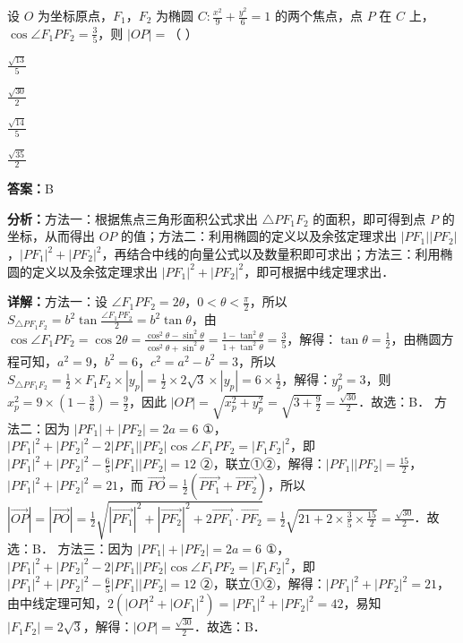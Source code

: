 \begin{question}[points=5]
设 $O$ 为坐标原点，$F_1$，$F_2$ 为椭圆 $C: \frac{x^2}{9} + \frac{y^2}{6} = 1$ 的两个焦点，点 $P$ 在 $C$ 上，$\cos\angle F_1PF_2 = \frac{3}{5}$，则 $|OP| = $（         ）
\begin{choices}
  \item $\frac{\sqrt{13}}{5}$
  \item $\frac{\sqrt{30}}{2}$
  \item $\frac{\sqrt{14}}{5}$
  \item $\frac{\sqrt{35}}{2}$
\end{choices}
\begin{solution}
\textbf{答案：}B

\textbf{分析：}方法一：根据焦点三角形面积公式求出 $\triangle PF_1F_2$ 的面积，即可得到点 $P$ 的坐标，从而得出 $OP$ 的值；方法二：利用椭圆的定义以及余弦定理求出 $|PF_1||PF_2|$，$|PF_1|^2+|PF_2|^2$，再结合中线的向量公式以及数量积即可求出；方法三：利用椭圆的定义以及余弦定理求出 $|PF_1|^2+|PF_2|^2$，即可根据中线定理求出．

\textbf{详解：}方法一：设 $\angle F_1PF_2 = 2\theta$，$0<\theta<\frac{\pi}{2}$，所以 $S_{\triangle PF_1F_2} = b^2\tan\frac{\angle F_1PF_2}{2} = b^2\tan\theta$，由 $\cos\angle F_1PF_2 = \cos2\theta = \frac{\cos^2\theta-\sin^2\theta}{\cos^2\theta+\sin^2\theta} = \frac{1-\tan^2\theta}{1+\tan^2\theta} = \frac{3}{5}$，解得：$\tan\theta = \frac{1}{2}$，由椭圆方程可知，$a^2=9$，$b^2=6$，$c^2=a^2-b^2=3$，所以 $S_{\triangle PF_1F_2} = \frac{1}{2}\times F_1F_2\times|y_p| = \frac{1}{2}\times2\sqrt{3}\times|y_p| = 6\times\frac{1}{2}$，解得：$y_p^2=3$，则 $x_p^2 = 9\times\left(1-\frac{3}{6}\right) = \frac{9}{2}$，因此 $|OP| = \sqrt{x_p^2+y_p^2} = \sqrt{3+\frac{9}{2}} = \frac{\sqrt{30}}{2}$．故选：B．
方法二：因为 $|PF_1|+|PF_2|=2a=6$ ①，$|PF_1|^2+|PF_2|^2-2|PF_1||PF_2|\cos\angle F_1PF_2 = |F_1F_2|^2$，即 $|PF_1|^2+|PF_2|^2 - \frac{6}{5}|PF_1||PF_2| = 12$ ②，联立①②，解得：$|PF_1||PF_2| = \frac{15}{2}$，$|PF_1|^2+|PF_2|^2 = 21$，而 $\overrightarrow{PO} = \frac{1}{2}(\overrightarrow{PF_1}+\overrightarrow{PF_2})$，所以 $|\overrightarrow{OP}| = |\overrightarrow{PO}| = \frac{1}{2}\sqrt{|\overrightarrow{PF_1}|^2+|\overrightarrow{PF_2}|^2+2\overrightarrow{PF_1}\cdot\overrightarrow{PF_2}} = \frac{1}{2}\sqrt{21+2\times\frac{3}{5}\times\frac{15}{2}} = \frac{\sqrt{30}}{2}$．故选：B．
方法三：因为 $|PF_1|+|PF_2|=2a=6$ ①，$|PF_1|^2+|PF_2|^2-2|PF_1||PF_2|\cos\angle F_1PF_2 = |F_1F_2|^2$，即 $|PF_1|^2+|PF_2|^2 - \frac{6}{5}|PF_1||PF_2| = 12$ ②，联立①②，解得：$|PF_1|^2+|PF_2|^2 = 21$，由中线定理可知，$2(|OP|^2+|OF_1|^2) = |PF_1|^2+|PF_2|^2 = 42$，易知 $|F_1F_2| = 2\sqrt{3}$，解得：$|OP| = \frac{\sqrt{30}}{2}$．故选：B．
\end{solution}
\end{question}

